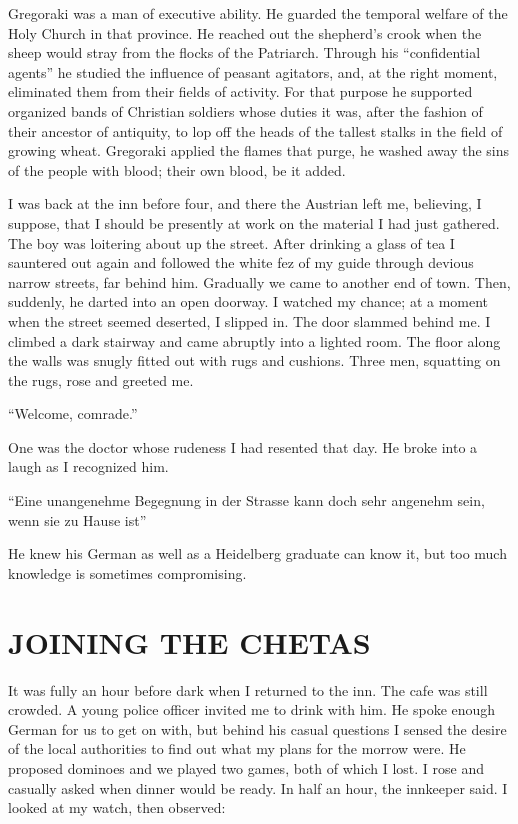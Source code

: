 \documentclass[a5paper,12pt]{book}
\begin{document}
Gregoraki was a man of executive ability. He guarded the temporal welfare of the Holy Church in that province. He reached out the shepherd’s crook when the sheep would stray from the flocks of the Patriarch. Through his “confidential agents” he studied the influence of peasant agitators, and, at the right moment, eliminated them from their fields of activity. For that purpose he supported organized bands of Christian soldiers whose duties it was, after the fashion of their ancestor of antiquity, to lop off the heads of the tallest stalks in the field of growing wheat. Gregoraki applied the flames that purge, he washed away the sins of the people with blood; their own blood, be it added. 

I was back at the inn before four, and there the Austrian left me, believing, I suppose, that I should be presently at work on the material I had just gathered. The boy was loitering about up the street.
After drinking a glass of tea I sauntered out again and followed the white fez of my guide through devious narrow streets, far behind him. Gradually we came to another end of town. Then, suddenly, he darted into an open doorway. I watched my chance; at a moment when the street seemed deserted, I slipped in. The door slammed behind me. I climbed a dark stairway and came abruptly into a lighted room. The floor along the walls was snugly fitted out with rugs and cushions. Three men, squatting on the rugs, rose and greeted me.

“Welcome, comrade.”

One was the doctor whose rudeness I had resented that day. He broke into a laugh as I recognized him.

“Eine unangenehme Begegnung in der Strasse kann doch sehr angenehm sein, wenn sie zu Hause ist”

He knew his German as well as a Heidelberg graduate can know it, but too much knowledge is sometimes compromising.


\chapter{JOINING THE CHETAS}

It was fully an hour before dark when I returned to the inn. The cafe was still crowded. A young police officer invited me to drink with him. He spoke enough German for us to get on with, but behind his casual questions I sensed the desire of the local authorities to find out what my plans for the morrow were. He proposed dominoes and we played two games, both of which I lost. I rose and casually asked when dinner would be ready. In half an hour, the innkeeper said. I looked at my watch, then observed:
\end{document}
